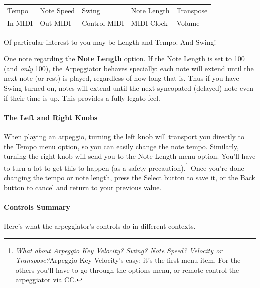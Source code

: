 \documentclass{article}
\begin{document}
\vspace{0.75em}
\begin{tabular}{lllll}
Tempo& Note Speed& Swing & Note Length&Transpose\\
In MIDI& Out MIDI&Control MIDI&MIDI Clock&Volume\\
\end{tabular}

\vspace{0.75em}
Of particular interest to you may be Length and Tempo.  And Swing!

One note regarding the {\bf Note Length} option.  If the Note Length is set to 100 (and {\it only} 100), the Arpeggiator behaves specially: each note will extend until the next note (or rest) is played, regardless of how long that is.  Thus if you have Swing turned on, notes will extend until the next syncopated (delayed) note even if their time is up. This provides a fully legato feel.


\paragraph{The Left and Right Knobs}  When playing an arpeggio, turning the left knob will transport you directly to the Tempo menu option, so you can easily change the note tempo.  Similarly, turning the right knob will send you to the Note Length menu option.  You'll have to turn a lot to get this to happen (as a safety precaution).\footnote{{\it What about Arpeggio Key Velocity?  Swing?  Note Speed? Velocity or Transpose?}\qquad Arpeggio Key Velocity's easy: it's the first menu item.  For the others you'll have to go through the options menu, or remote-control the arpeggiator via CC.}  Once you're done changing the tempo or note length, press the Select button to save it, or the Back button to cancel and return to your previous value.

\paragraph{Controls Summary}  Here's what the arpeggiator's controls do in different contexts.
\end{document}
